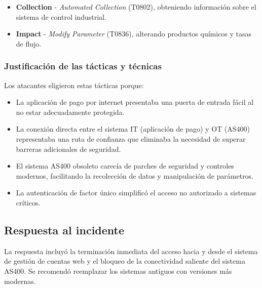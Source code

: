\begin{paracol}{2}
\begin{itemize}
    \item \textbf{Collection} - \textit{Automated Collection} (T0802), obteniendo información sobre el sistema de control industrial.
    
    \item \textbf{Impact} - \textit{Modify Parameter} (T0836), alterando productos químicos y tasas de flujo.
\end{itemize}

\subsubsection{Justificación de las tácticas y técnicas}
Los atacantes eligieron estas tácticas porque:

\begin{itemize}
    \item La aplicación de pago por internet presentaba una puerta de entrada fácil al no estar adecuadamente protegida.
    
    \item La conexión directa entre el sistema IT (aplicación de pago) y OT (AS400) representaba una ruta de confianza que eliminaba la necesidad de superar barreras adicionales de seguridad.
    
    \item El sistema AS400 obsoleto carecía de parches de seguridad y controles modernos, facilitando la recolección de datos y manipulación de parámetros.
    
    \item La autenticación de factor único simplificó el acceso no autorizado a sistemas críticos.
\end{itemize}
    \colfill
\end{paracol}


\subsection{Respuesta al incidente}

La respuesta incluyó la terminación inmediata del acceso hacia y desde el sistema de gestión de cuentas web y el bloqueo de la conectividad saliente del sistema AS400. Se recomendó reemplazar los sistemas antiguos con versiones más modernas.

